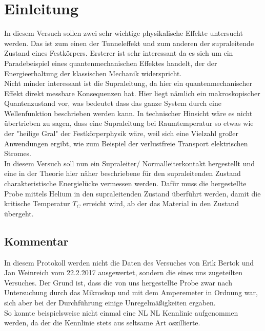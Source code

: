 \documentclass[twoside,        %
               BCOR12mm,       %
               english,ngerman, %
               fleqn,headsepline=false,footsepline=false
              ]{MFPREPORT}
\begin{document}
\date{\today}
\CopyNotWanted

\maketitle


\tableofcontents

\clearpage
{}

\section{Einleitung}


In diesem Versuch sollen zwei sehr wichtige physikalische Effekte untersucht werden.
Das ist zum einen der Tunneleffekt und zum anderen der supraleitende Zustand eines Festkörpers.
Ersterer ist sehr interessant da es sich um ein Paradebeispiel eines quantenmechanischen Effektes handelt,
der der Energieerhaltung der klassischen Mechanik widerspricht.
\\
Nicht minder interessant ist die Supraleitung, da hier ein quantenmechanischer Effekt direkt messbare Konsequenzen hat.
Hier liegt nämlich ein makroskopischer Quantenzustand vor, was bedeutet dass das ganze System durch
eine Wellenfunktion beschrieben werden kann. 
In technischer Hinsicht wäre es nicht übertrieben zu sagen, dass eine Supraleitung bei Raumtemperatur so etwas wie der "heilige Gral" der Festkörperphysik wäre, weil sich eine Vielzahl großer Anwendungen ergibt, wie zum Beispiel der verlustfreie Transport elektrischen Stromes.
\\
In diesem Versuch soll nun ein Supraleiter/ Normalleiterkontakt hergestellt und eine in der Theorie hier 
näher beschriebene für den supraleitenden Zustand charakteristische Energielücke
vermessen werden. Dafür muss die hergestellte Probe mittels Helium in den supraleitenden Zustand 
überführt werden, damit die kritische Temperatur $T_{C}$ erreicht wird, ab der das Material in den Zustand übergeht.

\subsection{Kommentar}
In diesem Protokoll werden nicht die Daten des Versuches von Erik Bertok und Jan Weinreich vom 22.2.2017 ausgewertet, sondern die eines uns zugeteilten Versuches.
Der Grund ist, dass die von uns hergestellte Probe zwar nach Untersuchung durch das Mikroskop und mit dem Amperemeter in Ordnung war, sich aber bei der Durchführung einige Unregelmäßigkeiten ergaben.
\\
So konnte beispielsweise nicht einmal eine NL NL Kennlinie aufgenommen werden, da der die Kennlinie stets aus seltsame Art oszillierte.
\end{document}
